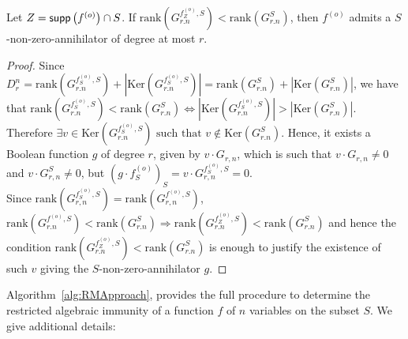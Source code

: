 \documentclass[11pt]{llncs}
\begin{document}
\begin{proposition}\label{prop:compareranks}
	Let $Z = \mathsf{supp}\left(f^{(o)}\right) \cap S$.
	If $\text{rank}\left(G^{f_{Z}^{(o)},S}_{r.n}\right) < \text{rank}(G^{S}_{r.n})$, then $f^{(o)}$ admits a $S$-non-zero-annihilator of degree at most $r$.
\end{proposition}
\begin{proof}
	Since $D_r^n = \text{rank}(G^{f^{(o)}_S,S}_{r.n}) + |\text{Ker}(G^{f^{(o)}_S,S}_{r.n})| =  \text{rank}(G^{S}_{r.n}) + |\text{Ker}(G^{S}_{r.n})|$, we have that
	$\text{rank}(G^{f_S^{(o)},S}_{r.n}) < \text{rank}(G^{S}_{r.n}) \iff |\text{Ker}(G^{f_S^{(o)},S}_{r.n})| > |\text{Ker}(G^{S}_{r.n})|$. 
	Therefore $\exists v\in \text{Ker}(G^{f_S^{(o)},S}_{r.n}) \mbox{ such that }v\not\in \text{Ker}(G^{S}_{r.n})$. 
	Hence, it exists a Boolean function $g$ of degree $r$, given by $v \cdot G_{r,n}$, which is such that $v \cdot G_{r,n}\neq 0$ and $v \cdot G_{r,n}^{S}\neq 0$, but $(g \cdot f_S^{(o)})_S = v \cdot G_{r,n}^{f_S^{(o)},S} = 0$.\\
	Since $\text{rank}\left(G_{r,n}^{f_S^{(o)}, S}\right) = \text{rank}\left(G_{r,n}^{f^{(o)}, S}\right)$, $\text{rank}(G^{f^{(o)},S}_{r.n}) < \text{rank}(G^{S}_{r.n}) \Rightarrow \text{rank}(G^{f_Z^{(o)},S}_{r.n}) < \text{rank}(G^{S}_{r.n})$ and hence the condition $\text{rank}(G^{f_Z^{(o)},S}_{r.n}) < \text{rank}(G^{S}_{r.n})$ is enough to justify the existence of such $v$ giving the $S$-non-zero-annihilator $g$.
\end{proof}

Algorithm~\ref{alg:RMApproach}, provides the full procedure to determine the restricted algebraic immunity of a function $f$ of $n$ variables on the subset $S$. We give additional details:
\end{document}
